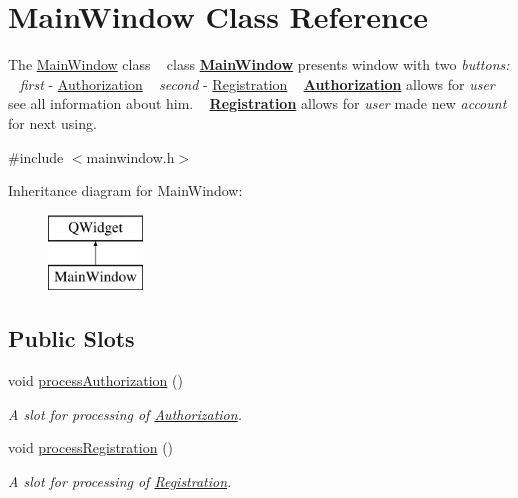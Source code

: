 \hypertarget{class_main_window}{}\section{Main\+Window Class Reference}
\label{class_main_window}


The \mbox{\hyperlink{class_main_window}{Main\+Window}} class ~\newline
class {\bfseries{\mbox{\hyperlink{class_main_window}{Main\+Window}}}} presents window with two {\itshape buttons\+:} ~\newline
{\itshape first} -\/ \mbox{\hyperlink{class_authorization}{Authorization}} ~\newline
{\itshape second} -\/ \mbox{\hyperlink{class_registration}{Registration}} ~\newline
{\bfseries{\mbox{\hyperlink{class_authorization}{Authorization}}}} allows for {\itshape user} see all information about him. ~\newline
{\bfseries{\mbox{\hyperlink{class_registration}{Registration}}}} allows for {\itshape user} made new {\itshape account} for next using.  




{\ttfamily \#include $<$mainwindow.\+h$>$}

Inheritance diagram for Main\+Window\+:\begin{figure}[H]
\begin{center}
\leavevmode
\includegraphics[height=2.000000cm]{class_main_window}
\end{center}
\end{figure}
\subsection*{Public Slots}
\begin{DoxyCompactItemize}
\item 
\mbox{\label{class_main_window_a98b723e032c72c77646fab3f427a283c}} 
void \mbox{\hyperlink{class_main_window_a98b723e032c72c77646fab3f427a283c}{process\+Authorization}} ()
\begin{DoxyCompactList}\small\item\em A {\itshape slot} for processing of {\itshape \mbox{\hyperlink{class_authorization}{Authorization}}}. \end{DoxyCompactList}\item 
\mbox{\label{class_main_window_a34c3eaadf05f21c574d195ec2409b591}} 
void \mbox{\hyperlink{class_main_window_a34c3eaadf05f21c574d195ec2409b591}{process\+Registration}} ()
\begin{DoxyCompactList}\small\item\em A {\itshape slot} for processing of {\itshape \mbox{\hyperlink{class_registration}{Registration}}}. \end{DoxyCompactList}\end{DoxyCompactItemize}
